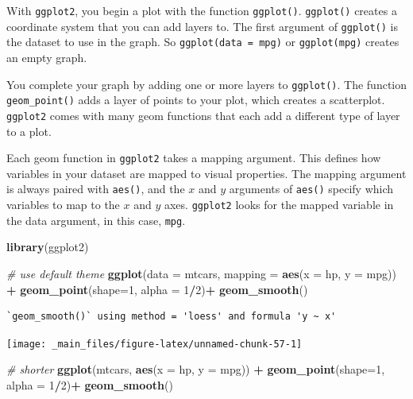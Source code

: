 \documentclass[
]{book}
\newenvironment{Shaded}{\begin{snugshade}}{\end{snugshade}}
\newcommand{\CommentTok}[1]{\textcolor[rgb]{0.56,0.35,0.01}{\textit{#1}}}
\newcommand{\DataTypeTok}[1]{\textcolor[rgb]{0.13,0.29,0.53}{#1}}
\newcommand{\DecValTok}[1]{\textcolor[rgb]{0.00,0.00,0.81}{#1}}
\newcommand{\KeywordTok}[1]{\textcolor[rgb]{0.13,0.29,0.53}{\textbf{#1}}}
\newcommand{\NormalTok}[1]{#1}
\newcommand{\OperatorTok}[1]{\textcolor[rgb]{0.81,0.36,0.00}{\textbf{#1}}}
\newcommand{\StringTok}[1]{\textcolor[rgb]{0.31,0.60,0.02}{#1}}
\begin{document}
With \texttt{ggplot2}, you begin a plot with the function \texttt{ggplot()}. \texttt{ggplot()} creates a coordinate system that you can add layers to. The first argument of \texttt{ggplot()} is the dataset to use in the graph. So \texttt{ggplot(data\ =\ mpg)} or \texttt{ggplot(mpg)} creates an empty graph.

You complete your graph by adding one or more layers to \texttt{ggplot()}. The function \texttt{geom\_point()} adds a layer of points to your plot, which creates a scatterplot. \texttt{ggplot2} comes with many geom functions that each add a different type of layer to a plot.

Each geom function in \texttt{ggplot2} takes a mapping argument. This defines how variables in your dataset are mapped to visual properties. The mapping argument is always paired with \texttt{aes()}, and the \(x\) and \(y\) arguments of \texttt{aes()} specify which variables to map to the \(x\) and \(y\) axes. \texttt{ggplot2} looks for the mapped variable in the data argument, in this case, \texttt{mpg}.

\begin{Shaded}
\begin{Highlighting}[]
\KeywordTok{library}\NormalTok{(ggplot2)}

\CommentTok{# use default theme}
\KeywordTok{ggplot}\NormalTok{(}\DataTypeTok{data =}\NormalTok{ mtcars, }\DataTypeTok{mapping =} \KeywordTok{aes}\NormalTok{(}\DataTypeTok{x =}\NormalTok{ hp, }\DataTypeTok{y =}\NormalTok{ mpg)) }\OperatorTok{+}
\StringTok{  }\KeywordTok{geom_point}\NormalTok{(}\DataTypeTok{shape=}\DecValTok{1}\NormalTok{, }\DataTypeTok{alpha =} \DecValTok{1}\OperatorTok{/}\DecValTok{2}\NormalTok{)}\OperatorTok{+}
\StringTok{  }\KeywordTok{geom_smooth}\NormalTok{() }
\end{Highlighting}
\end{Shaded}

\begin{verbatim}
`geom_smooth()` using method = 'loess' and formula 'y ~ x'
\end{verbatim}

\begin{center}\texttt{[image: \_main\_files/figure-latex/unnamed-chunk-57-1]} \end{center}

\begin{Shaded}
\begin{Highlighting}[]
\CommentTok{# shorter}
\KeywordTok{ggplot}\NormalTok{(mtcars, }\KeywordTok{aes}\NormalTok{(}\DataTypeTok{x =}\NormalTok{ hp, }\DataTypeTok{y =}\NormalTok{ mpg)) }\OperatorTok{+}
\StringTok{  }\KeywordTok{geom_point}\NormalTok{(}\DataTypeTok{shape=}\DecValTok{1}\NormalTok{, }\DataTypeTok{alpha =} \DecValTok{1}\OperatorTok{/}\DecValTok{2}\NormalTok{)}\OperatorTok{+}
\StringTok{  }\KeywordTok{geom_smooth}\NormalTok{() }
\end{Highlighting}
\end{Shaded}
\end{document}

